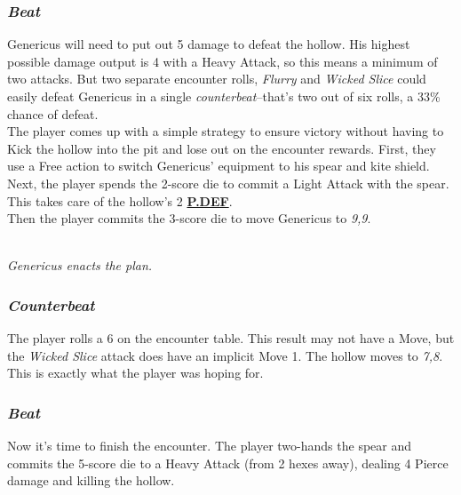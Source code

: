 \documentclass[12pt]{article}
\newcommand{\refto}[1]{\hyperlink{#1}{\textbf{#1}}}
\begin{document}
\begin{multicols*}{2}
\subsubsection*{\emph{Beat}}
Genericus will need to put out 5 damage to defeat the hollow. His highest possible damage output is 4 with a Heavy Attack, so this means a minimum of two attacks. But two separate encounter rolls, \emph{Flurry} and \emph{Wicked Slice} could easily defeat Genericus in a single \emph{counterbeat}--that’s two out of six rolls, a 33\% chance of defeat.\\
The player comes up with a simple strategy to ensure victory without having to Kick the hollow into the pit and lose out on the encounter rewards. First, they use a Free action to switch Genericus’ equipment to his spear and kite shield.\\
Next, the player spends the 2-score die to commit a Light Attack with the spear. This takes care of the hollow’s 2 \refto{P.DEF}.\\
Then the player commits the 3-score die to move Genericus to \emph{9,9}.
\begin{center}
\\
\emph{Genericus enacts the plan.}
\end{center}
\subsubsection*{\emph{Counterbeat}}
The player rolls a 6 on the encounter table. This result may not have a Move, but the \emph{Wicked Slice} attack does have an implicit Move 1. The hollow moves to \emph{7,8}. This is exactly what the player was hoping for.
\subsubsection*{\emph{Beat}}
Now it’s time to finish the encounter. The player two-hands the spear and commits the 5-score die to a Heavy Attack (from 2 hexes away), dealing 4 Pierce damage and killing the hollow.


\end{multicols*}
\end{document}
